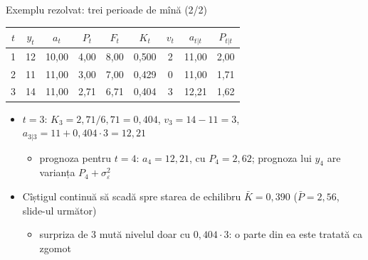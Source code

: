 \begin{frame}{Exemplu rezolvat: trei perioade de mînă (2/2)}
\itemsize{\small}
\begin{center}
\footnotesize
\begin{tabular}{ccccccccc}
\toprule
$t$ & $y_t$ & $a_t$ & $P_t$ & $F_t$ & $K_t$ & $v_t$ & $a_{t|t}$ & $P_{t|t}$ \\
\midrule
1 & 12 & 10{,}00 & 4{,}00 & 8{,}00 & 0{,}500 & 2 & 11{,}00 & 2{,}00 \\
2 & 11 & 11{,}00 & 3{,}00 & 7{,}00 & 0{,}429 & 0 & 11{,}00 & 1{,}71 \\
3 & 14 & 11{,}00 & 2{,}71 & 6{,}71 & 0{,}404 & 3 & 12{,}21 & 1{,}62 \\
\bottomrule
\end{tabular}
\end{center}
\begin{itemize}
    \item $t = 3$: $K_3 = 2{,}71/6{,}71 = 0{,}404$, $v_3 = 14 - 11 = 3$, $a_{3|3} = 11 + 0{,}404 \cdot 3 = 12{,}21$
    \begin{itemize}
        \item prognoza pentru $t = 4$: $a_4 = 12{,}21$, cu $P_4 = 2{,}62$; prognoza lui $y_4$ are varianța $P_4 + \sigma^2_\varepsilon$
    \end{itemize}
    \item Cîștigul continuă să scadă spre starea de echilibru $\bar K = 0{,}390$ ($\bar P = 2{,}56$, slide-ul următor)
    \begin{itemize}
        \item surpriza de 3 mută nivelul doar cu $0{,}404 \cdot 3$: o parte din ea este tratată ca zgomot
    \end{itemize}
\end{itemize}
\end{frame}

